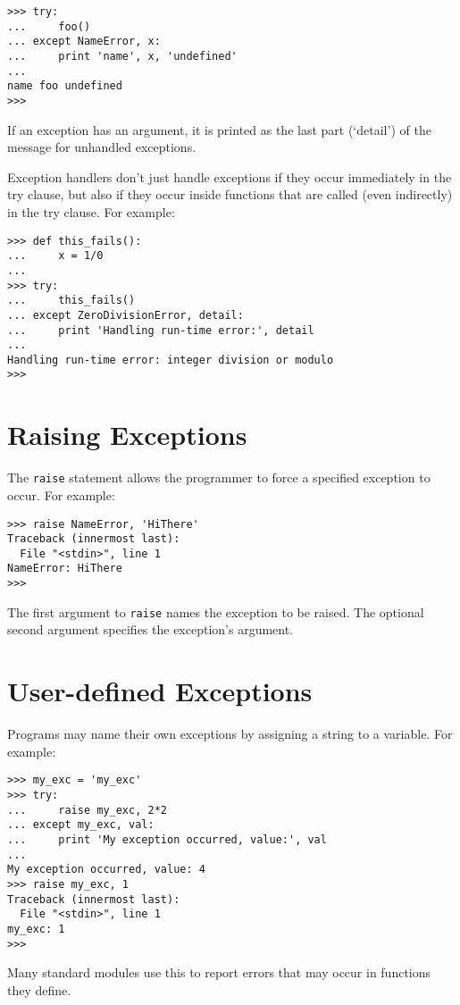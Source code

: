 \bcode\begin{verbatim}
>>> try:
...     foo()
... except NameError, x:
...     print 'name', x, 'undefined'
... 
name foo undefined
>>> 
\end{verbatim}\ecode
%
If an exception has an argument, it is printed as the last part
(`detail') of the message for unhandled exceptions.

Exception handlers don't just handle exceptions if they occur
immediately in the try clause, but also if they occur inside functions
that are called (even indirectly) in the try clause.
For example:

\bcode\begin{verbatim}
>>> def this_fails():
...     x = 1/0
... 
>>> try:
...     this_fails()
... except ZeroDivisionError, detail:
...     print 'Handling run-time error:', detail
... 
Handling run-time error: integer division or modulo
>>> 
\end{verbatim}\ecode

\section{Raising Exceptions}

The {\tt raise} statement allows the programmer to force a specified
exception to occur.
For example:

\bcode\begin{verbatim}
>>> raise NameError, 'HiThere'
Traceback (innermost last):
  File "<stdin>", line 1
NameError: HiThere
>>> 
\end{verbatim}\ecode
%
The first argument to {\tt raise} names the exception to be raised.
The optional second argument specifies the exception's argument.

\section{User-defined Exceptions}

Programs may name their own exceptions by assigning a string to a
variable.
For example:

\bcode\begin{verbatim}
>>> my_exc = 'my_exc'
>>> try:
...     raise my_exc, 2*2
... except my_exc, val:
...     print 'My exception occurred, value:', val
... 
My exception occurred, value: 4
>>> raise my_exc, 1
Traceback (innermost last):
  File "<stdin>", line 1
my_exc: 1
>>> 
\end{verbatim}\ecode
%
Many standard modules use this to report errors that may occur in
functions they define.

